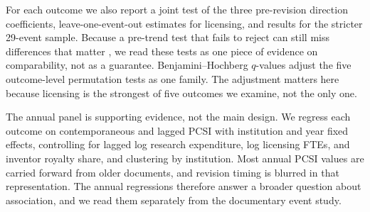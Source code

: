 For each outcome we also report a joint test of the three pre-revision direction coefficients, leave-one-event-out estimates for licensing, and results for the stricter 29-event sample. Because a pre-trend test that fails to reject can still miss differences that matter \citep{Roth2022}, we read these tests as one piece of evidence on comparability, not as a guarantee. Benjamini--Hochberg $q$-values adjust the five outcome-level permutation tests as one family. The adjustment matters here because licensing is the strongest of five outcomes we examine, not the only one.

The annual panel is supporting evidence, not the main design. We regress each outcome on contemporaneous and lagged PCSI with institution and year fixed effects, controlling for lagged log research expenditure, log licensing FTEs, and inventor royalty share, and clustering by institution. Most annual PCSI values are carried forward from older documents, and revision timing is blurred in that representation. The annual regressions therefore answer a broader question about association, and we read them separately from the documentary event study.
